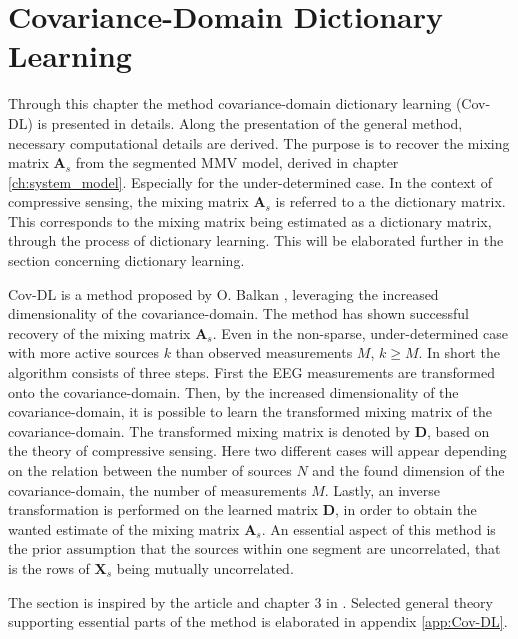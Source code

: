 \chapter{Covariance-Domain Dictionary Learning}\label{ch:Cov-DL}
Through this chapter the method covariance-domain dictionary learning (Cov-DL) is presented in details. 
Along the presentation of the general method, necessary computational details are derived.
The purpose is to recover the mixing matrix $\mathbf{A}_s$ from the segmented MMV model, derived in chapter \ref{ch:system_model}. Especially for the under-determined case. 
In the context of compressive sensing, the mixing matrix $\mathbf{A}_s$ is referred to a the dictionary matrix. 
This corresponds to the mixing matrix being estimated as a dictionary matrix, through the process of dictionary learning. 
This will be elaborated further in the section concerning dictionary learning.

Cov-DL is a method proposed by O. Balkan \cite{Balkan2015}, leveraging the increased dimensionality of the covariance-domain. 
The method has shown successful recovery of the mixing matrix $\mathbf{A}_s$. Even in the non-sparse, under-determined case with more active sources $k$ than observed measurements $M$, $k \geq M$. 
In short the algorithm consists of three steps. 
First the EEG measurements are transformed onto the covariance-domain. 
Then, by the increased dimensionality of the covariance-domain, it is possible to learn the transformed mixing matrix of the covariance-domain. The transformed mixing matrix is denoted by $\mathbf{D}$, based on the theory of compressive sensing. 
Here two different cases will appear depending on the relation between the number of sources $N$ and the found dimension of the covariance-domain, the number of measurements $M$. 
Lastly, an inverse transformation is performed on the learned matrix $\mathbf{D}$, in order to obtain the wanted estimate of the mixing matrix $\mathbf{A}_s$. 
An essential aspect of this method is the prior assumption that the sources within one segment are uncorrelated, that is the rows of $\mathbf{X}_s$ being mutually uncorrelated. 

The section is inspired by the article \cite{Balkan2015} and chapter 3 in \cite{phd2015}. 
Selected general theory supporting essential parts of the method is elaborated in appendix \ref{app:Cov-DL}.


%